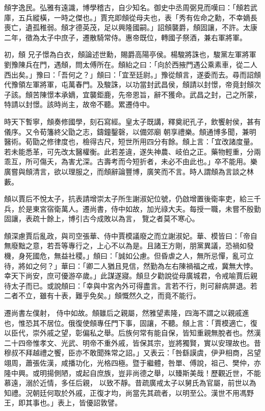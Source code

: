 \begin{pinyinscope}
 頠字逸民。弘雅有遠識，博學稽古，自少知名。御史中丞周弼見而嘆曰：「頠若武庫，五兵縱橫，一時之傑也。」賈充即頠從母夫也，表「秀有佐命之勳，不幸嫡長喪亡，遺孤稚弱。頠才德英茂，足以興隆國嗣。」詔頠襲爵，頠固讓，不許。太康二年，徵為太子中庶子，遷散騎常侍。惠帝既位，轉國子祭酒，兼右軍將軍。



 初，頠
 兄子憬為白衣，頠論述世勳，賜爵高陽亭侯。楊駿將誅也，駿黨左軍將軍劉豫陳兵在門，遇頠，問太傅所在。頠紿之曰：「向於西掖門遇公乘素車，從二人西出矣。」豫曰：「吾何之？」頠曰：「宜至廷尉。」豫從頠言，遂委而去。尋而詔頠代豫領左軍將軍，屯萬春門。及駿誅，以功當封武昌侯，頠請以封憬，帝竟封頠次子該。頠苦陳憬本承嫡，宜襲鉅鹿，先帝恩旨，辭不獲命。武昌之封，己之所蒙，特請以封憬。該時尚主，故帝不聽。累遷侍中。



 時天下暫寧，頠奏修國學，刻石寫經。皇太子既講，釋奠祀孔子，飲饗射侯，甚有儀序。又令荀籓終父勖之志，鑄鐘鑿磬，以備郊廟
 朝享禮樂。頠通博多聞，兼明醫術。荀勖之修律度也，檢得古尺，短世所用四分有餘。頠上言：「宜改諸度量。若未能悉革，可先改太醫權衡。此若差違，遂失神農、岐伯之正。藥物輕重，分兩乖互，所可傷夭，為害尤深。古壽考而今短折者，未必不由此也。」卒不能用。樂廣嘗與頠清言，欲以理服之，而頠辭論豐博，廣笑而不言。時人謂頠為言談之林藪。



 頠以賈后不悅太子，抗表請增崇太子所生謝淑妃位號，仍啟增置後衛率吏，給三千兵，於是東宮宿衛萬人。遷尚書，侍中如故，加光祿大夫。每授一職，未嘗不殷勤固讓，表疏十餘上，博引古今成敗以為言，
 覽之者莫不寒心。



 頠深慮賈后亂政，與司空張華、侍中賈模議廢之而立謝淑妃。華、模皆曰：「帝自無廢黜之意，若吾等專行之，上心不以為是。且諸王方剛，朋黨異議，恐禍如發機，身死國危，無益社稷。」頠曰：「誠如公慮。但昏虐之人，無所忌憚，亂可立待，將如之何？」華曰：「卿二人猶且見信，然勤為左右陳禍福之戒，冀無大悖。幸天下尚安，庶可優游卒歲。」此謀遂寢。頠旦夕勸說從母廣城君，令戒喻賈后親待太子而已。或說頠曰：「幸與中宮內外可得盡言。言若不行，則可辭病屏退。若二者不立，雖有十表，難乎免矣。」頠慨然久之，而竟不能行。



 遷尚書左僕射，
 侍中如故。頠雖后之親屬，然雅望素隆，四海不謂之以親戚進也，惟恐其不居位。俄復使頠專任門下事，固讓，不聽。頠上言：「賈模適亡，復以臣代，崇外戚之望，彰偏私之舉。后族何常有能自保，皆知重親無脫者也。然漢二十四帝惟孝文、光武、明帝不重外戚，皆保其宗，豈將獨賢，實以安理故也。昔穆叔不拜越禮之饗，臣亦不敢聞殊常之詔。」又表云：「咎繇謨虞，伊尹相商，呂望翊周，蕭張佐漢，咸播功化，光格四極。暨于繼體，咎單、傅說，祖己、樊仲，亦隆中興。或明揚側陋，或起自庶族，豈非尚德之舉，以臻斯美哉！歷觀近世，不能慕遠，溺於近情，多任后親，
 以致不靜。昔疏廣戒太子以舅氏為官屬，前世以為知禮。況朝廷何取於外戚，正復才均，尚當先其疏者，以明至公。漢世不用馮野王，即其事也。」表上，皆優詔敦譬。




\end{pinyinscope}
